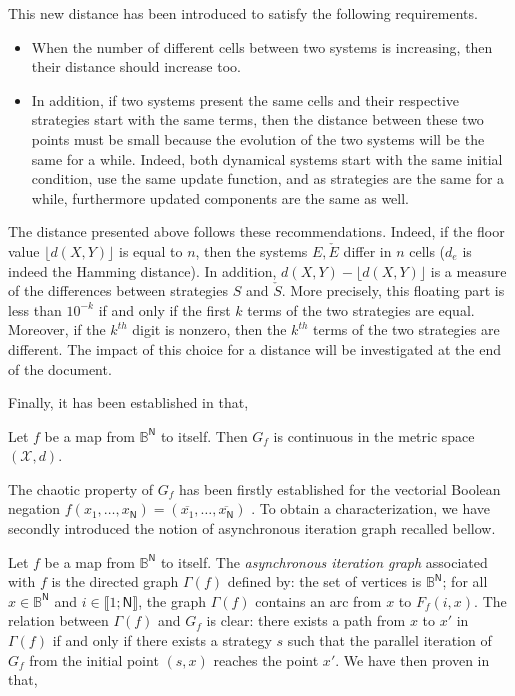 \documentclass{article}
\begin{document}
This new distance has been introduced to satisfy the following requirements.
\begin{itemize}
\item When the number of different cells between two systems is increasing, then
their distance should increase too.
\item In addition, if two systems present the same cells and their respective
strategies start with the same terms, then the distance between these two points
must be small because the evolution of the two systems will be the same for a
while. Indeed, both dynamical systems start with the same initial condition,
use the same update function, and as strategies are the same for a while, furthermore
updated components are the same as well.
\end{itemize}
The distance presented above follows these recommendations. Indeed, if the floor
value $\lfloor d(X,Y)\rfloor $ is equal to $n$, then the systems $E, \check{E}$
differ in $n$ cells ($d_e$ is indeed the Hamming distance). In addition, $d(X,Y) - \lfloor d(X,Y) \rfloor $ is a
measure of the differences between strategies $S$ and $\check{S}$. More
precisely, this floating part is less than $10^{-k}$ if and only if the first
$k$ terms of the two strategies are equal. Moreover, if the $k^{th}$ digit is
nonzero, then the $k^{th}$ terms of the two strategies are different.
The impact of this choice for a distance will be investigated at the end of the document.

Finally, it has been established in \cite{guyeux10} that,

\begin{proposition}
Let $f$ be a map from $\mathds{B}^\mathsf{N}$ to itself. Then $G_{f}$ is continuous in
the metric space $(\mathcal{X},d)$.
\end{proposition}

The chaotic property of $G_f$ has been firstly established for the vectorial
Boolean negation $f(x_1,\hdots, x_\mathsf{N}) =  (\overline{x_1},\hdots, \overline{x_\mathsf{N}})$ \cite{guyeux10}. To obtain a characterization, we have secondly
introduced the notion of asynchronous iteration graph recalled bellow.

Let $f$ be a map from $\mathds{B}^\mathsf{N}$ to itself. The
{\emph{asynchronous iteration graph}} associated with $f$ is the
directed graph $\Gamma(f)$ defined by: the set of vertices is
$\mathds{B}^\mathsf{N}$; for all $x\in\mathds{B}^\mathsf{N}$ and 
$i\in \llbracket1;\mathsf{N}\rrbracket$,
the graph $\Gamma(f)$ contains an arc from $x$ to $F_f(i,x)$. 
The relation between $\Gamma(f)$ and $G_f$ is clear: there exists a
path from $x$ to $x'$ in $\Gamma(f)$ if and only if there exists a
strategy $s$ such that the parallel iteration of $G_f$ from the
initial point $(s,x)$ reaches the point $x'$.
We have then proven in \cite{bcgr11:ip} that,
\end{document}
